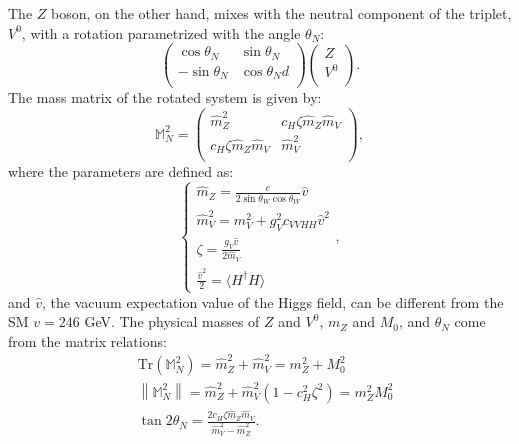 The $Z$ boson, on the other hand, mixes with the neutral component of the triplet, $V^0$, with a rotation parametrized with the angle $\theta_N$:
\begin{equation}
\begin{pmatrix}
\cos{\theta_N} & \sin{\theta_N} \\
-\sin{\theta_N} & \cos{\theta_N}d \\
\end{pmatrix}
\begin{pmatrix}
Z  \\
V^0  \\
\end{pmatrix}
.
\label{eq:mixing}
\end{equation}
The mass matrix of the rotated system is given by:
\begin{equation}
\mathbb{M}_N^2 =
\begin{pmatrix}
\hat{m}_Z^2 & c_H \zeta \hat{m}_Z \hat{m}_V \\
c_H \zeta \hat{m}_Z \hat{m}_V & \hat{m}_V^2 \\
\end{pmatrix}
,
\label{eq:mass_matrix_Z}
\end{equation}
where the parameters are defined as:
\begin{equation}
\left\{
\begin{array}{l}
\hat{m}_Z = \frac{e}{2 \sin{\theta_W} \cos{\theta_W}}\hat{v} \\
\hat{m}_V^2 = m_V^2 + g_V^2 c_{VVHH} {\hat{v}}^2\\
\zeta = \frac{g_V \hat{v}}{2 \hat{m}_V}\\
\frac{\hat{v}^2}{2} = \langle H^{\dagger} H \rangle
\end{array},
\right.
\label{eq:mass_matrix_param_Z}
\end{equation}
and $\hat{v}$, the vacuum expectation value of the Higgs field, can be different from the SM $v = 246$ GeV. The physical masses of $Z$ and $V^0$, $m_Z$ and $M_0$, and $\theta_N$ come from the matrix relations:
\begin{equation}
\begin{split}
 & \mbox{Tr}\left( \mathbb{M}_N^2 \right) = \hat{m}_Z^2 + \hat{m}_V^2 = m_Z^2 + M_0^2\\
 & \left\| \mathbb{M}_N^2 \right\| = \hat{m}_Z^2 + \hat{m}_V^2 \left( 1 - c_H^2 {\zeta}^2\right) = m_Z^2 M_0^2 \\
 & \tan{2 \theta_N} = \frac{2 c_H \zeta \hat{m}_Z \hat{m}_V}{\hat{m}_V^2 - \hat{m}_Z^2}.
\end{split}
\label{eq:mass_eig_Z}
\end{equation}

